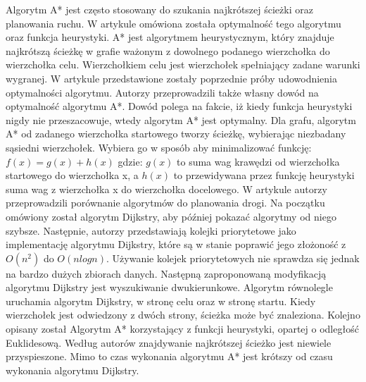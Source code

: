 \indent
Algorytm A* jest często stosowany do szukania najkrótszej ścieżki oraz planowania ruchu. W artykule \cite{dechter1985generalized} omówiona została optymalność tego algorytmu oraz funkcja heurystyki. A* jest algorytmem heurystycznym, który znajduje najkrótszą ścieżkę w grafie ważonym z dowolnego podanego wierzchołka do wierzchołka celu. Wierzchołkiem celu jest wierzchołek spełniający zadane warunki wygranej. W artykule przedstawione zostały poprzednie próby udowodnienia optymalności algorytmu. Autorzy przeprowadzili także własny dowód na optymalność algorytmu A*. Dowód polega na fakcie, iż kiedy funkcja heurystyki nigdy nie przeszacowuje, wtedy algorytm A* jest optymalny. Dla grafu, algorytm A* od zadanego wierzchołka startowego tworzy ścieżkę, wybierając niezbadany sąsiedni wierzchołek. Wybiera go w sposób aby minimalizować funkcję:
\newline
\newline
\begin{math} f(x) = g(x) + h(x)\end{math}
\newline
\newline
gdzie:
\newline
\newline
\begin{math} g(x) \end{math} to suma wag krawędzi od wierzchołka startowego do wierzchołka x, a
\begin{math} h(x) \end{math} to przewidywana przez funkcję heurystyki suma wag z wierzchołka x do wierzchołka docelowego.
\newline
\indent
W artykule \cite{delling2009engineering} autorzy przeprowadzili porównanie algorytmów do planowania drogi. Na początku omówiony został algorytm Dijkstry, aby później pokazać algorytmy od niego szybsze. Następnie, autorzy przedstawiają kolejki priorytetowe jako implementację algorytmu Dijkstry, które są w stanie poprawić jego złożoność z \begin{math} O(n^2) \end{math} do \begin{math} O(nlogn) \end{math}. Używanie kolejek priorytetowych nie sprawdza się jednak na bardzo dużych zbiorach danych. Następną zaproponowaną modyfikacją algorytmu Dijkstry jest wyszukiwanie dwukierunkowe. Algorytm równolegle uruchamia algorytm Dijkstry, w stronę celu oraz w stronę startu. Kiedy wierzchołek jest odwiedzony z dwóch strony, ścieżka może być znaleziona. Kolejno opisany został Algorytm A* korzystający z funkcji heurystyki, opartej o odległość Euklidesową. Według autorów znajdywanie najkrótszej ścieżko jest niewiele przyspieszone. Mimo to czas wykonania algorytmu A* jest krótszy od czasu wykonania algorytmu Dijkstry.
